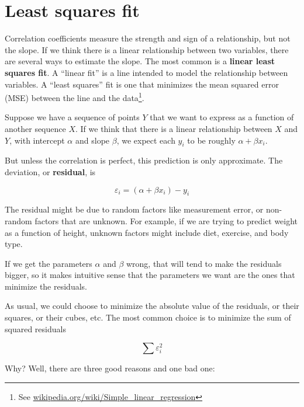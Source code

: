 \documentclass[12pt]{book}
\begin{document}
\section{Least squares fit}

\newcommand{\slope}{\beta}
\newcommand{\inter}{\alpha}

Correlation coefficients measure the strength and sign of a
relationship, but not the slope.  If we think there is a linear
relationship between two variables, there are several ways to estimate
the slope.  The most common is a {\bf linear least squares fit}.  A
``linear fit'' is a line intended to model the relationship between
variables.  A ``least squares'' fit is one that minimizes the mean
squared error (MSE) between the line and the data\footnote{See
  \url{wikipedia.org/wiki/Simple_linear_regression}}.

Suppose we have a sequence of points $Y$ that we want to express
as a function of another sequence $X$.  If we think that there is
a linear relationship between $X$ and $Y$, with intercept $\inter$
and slope $\slope$, we expect each $y_i$ to be roughly $\inter + \slope x_i$.

But unless the correlation is perfect, this prediction is only
approximate.  The deviation, or {\bf residual}, is 

\newcommand{\eps}{\varepsilon}

\[ \eps_i = (\inter + \slope x_i) - y_i \]

The residual might be due to random factors like measurement error,
or non-random factors that are unknown.  For example, if we are
trying to predict weight as a function of height, unknown factors
might include diet, exercise, and body type.

If we get the parameters $\inter$ and $\slope$ wrong, that will tend
to make the residuals bigger, so it makes intuitive sense that the
parameters we want are the ones that minimize the residuals.

As usual, we could choose to minimize the absolute value of the
residuals, or their squares, or their cubes, etc.  The most common
choice is to minimize the sum of squared residuals

\[ \sum \eps_i^2 \]

Why?  Well, there are three good reasons and one bad one:
\end{document}
